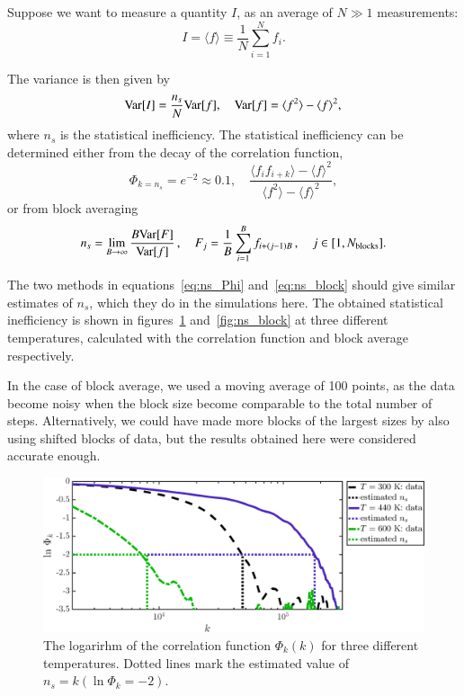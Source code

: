 Suppose we want to measure a quantity $I$, as an average of $N\gg1$ measurements: 
\begin{equation}
I = \langle f \rangle \equiv \frac{1}{N}\sum_{i = 1}^N f_i.
\end{equation}

The variance is then given by 
\begin{equation}
{\rm Var}[I] = \frac{n_s}{N}{\rm Var}[f], \quad {\rm Var}[f] = \langle f^2 \rangle - \langle f \rangle^2,
\end{equation}
where $n_s$ is the statistical inefficiency. 
The statistical inefficiency can be determined either from the decay of the correlation function, 
\begin{equation}
\Phi_{k = n_s} = e^{-2} \approx 0.1, \quad \frac{\langle f_i f_{i+k}\rangle - \langle f \rangle^2}{\langle f^2\rangle - \langle f \rangle^2},
\label{eq:ns_Phi}
\end{equation}
or from block averaging
\begin{equation}
n_s = \lim_{B \rightarrow \infty} \frac{B {\rm Var}[F]}{{\rm Var}[f]}\,, \quad F_j = \frac{1}{B}\sum_{i = 1}^B f_{i + (j-1)B}\,, \quad j \in [1, N_{\rm blocks} ].
\label{eq:ns_block}
\end{equation}

The two methods in equations~\eqref{eq:ns_Phi} and~\eqref{eq:ns_block} should give similar estimates of $n_s$, which they do in the simulations here. The obtained statistical inefficiency is shown in figures~\ref{fig:ns_phi} and~\ref{fig:ns_block}   at three different temperatures, calculated with the correlation function and block average respectively. 

In the case of block average, we used a moving average of 100 points, as the data become noisy when the block size become comparable to the total number of steps. Alternatively, we could have made more blocks of the largest sizes by also using shifted blocks of data, but the results obtained here were considered accurate enough. 

\begin{figure}[!ht]
\begin{center}
  \includegraphics[width=\textwidth]{../figures/stat_inefficiency_Phi} 
  \caption{The logarirhm of the correlation function $\Phi_k(k)$ for three different temperatures. Dotted lines mark the estimated value of $n_s = k (\ln \Phi_k = -2)$.}
  \label{fig:ns_phi}
\end{center}
\end{figure}

